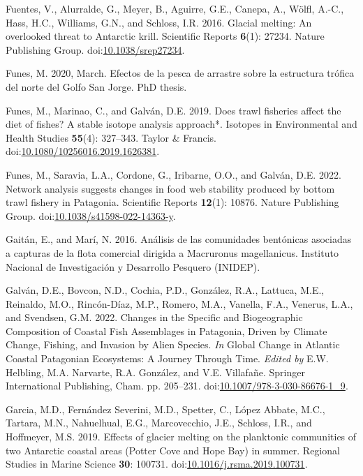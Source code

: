 \documentclass[
]{article}
\newlength{\cslhangindent}
\newenvironment{CSLReferences}[2] %
 {\begin{list}{}{%
  \setlength{\itemindent}{0pt}
  \setlength{\leftmargin}{0pt}
  \setlength{\parsep}{0pt}
  \ifodd #1
   \setlength{\leftmargin}{\cslhangindent}
   \setlength{\itemindent}{-1\cslhangindent}
  \fi
  \setlength{\itemsep}{#2\baselineskip}}}
 {\end{list}}
\begin{document}
\begin{CSLReferences}{1}{0}
Fuentes, V., Alurralde, G., Meyer, B., Aguirre, G.E., Canepa, A., Wölfl,
A.-C., Hass, H.C., Williams, G.N., and Schloss, I.R. 2016. Glacial
melting: An overlooked threat to {Antarctic} krill. Scientific Reports
\textbf{6}(1): 27234. Nature Publishing Group.
doi:\href{https://doi.org/10.1038/srep27234}{10.1038/srep27234}.

Funes, M. 2020, March. Efectos de la pesca de arrastre sobre la
estructura tr{ó}fica del norte del {Golfo San Jorge}. PhD thesis.

Funes, M., Marinao, C., and Galván, D.E. 2019. Does trawl fisheries
affect the diet of fishes? {A} stable isotope analysis approach*.
Isotopes in Environmental and Health Studies \textbf{55}(4): 327--343.
Taylor \& Francis.
doi:\href{https://doi.org/10.1080/10256016.2019.1626381}{10.1080/10256016.2019.1626381}.

Funes, M., Saravia, L.A., Cordone, G., Iribarne, O.O., and Galván, D.E.
2022. Network analysis suggests changes in food web stability produced
by bottom trawl fishery in {Patagonia}. Scientific Reports
\textbf{12}(1): 10876. Nature Publishing Group.
doi:\href{https://doi.org/10.1038/s41598-022-14363-y}{10.1038/s41598-022-14363-y}.

Gaitán, E., and Marí, N. 2016. {An{á}lisis de las comunidades
bent{ó}nicas asociadas a capturas de la flota comercial dirigida a
Macruronus magellanicus}. Instituto Nacional de Investigaci{ó}n y
Desarrollo Pesquero (INIDEP).

Galván, D.E., Bovcon, N.D., Cochia, P.D., González, R.A., Lattuca, M.E.,
Reinaldo, M.O., Rincón-Díaz, M.P., Romero, M.A., Vanella, F.A., Venerus,
L.A., and Svendsen, G.M. 2022. Changes in the {Specific} and
{Biogeographic Composition} of {Coastal Fish Assemblages} in
{Patagonia}, {Driven} by {Climate Change}, {Fishing}, and {Invasion} by
{Alien Species}. \emph{In} Global {Change} in {Atlantic Coastal
Patagonian Ecosystems}: {A Journey Through Time}. \emph{Edited by} E.W.
Helbling, M.A. Narvarte, R.A. González, and V.E. Villafañe. Springer
International Publishing, Cham. pp. 205--231.
doi:\href{https://doi.org/10.1007/978-3-030-86676-1_9}{10.1007/978-3-030-86676-1\_9}.

Garcia, M.D., Fernández Severini, M.D., Spetter, C., López Abbate, M.C.,
Tartara, M.N., Nahuelhual, E.G., Marcovecchio, J.E., Schloss, I.R., and
Hoffmeyer, M.S. 2019. Effects of glacier melting on the planktonic
communities of two {Antarctic} coastal areas ({Potter Cove} and {Hope
Bay}) in summer. Regional Studies in Marine Science \textbf{30}: 100731.
doi:\href{https://doi.org/10.1016/j.rsma.2019.100731}{10.1016/j.rsma.2019.100731}.


\end{CSLReferences}
\end{document}
